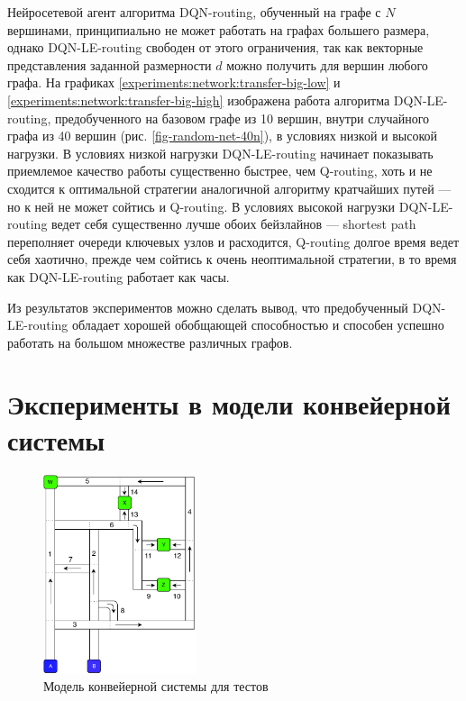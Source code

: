 \documentclass[specification,annotation,times]{itmo-student-thesis}
\theoremstyle{definition}
\begin{document}
Нейросетевой агент алгоритма DQN-routing, обученный на графе с $N$ вершинами,
принципиально не может работать на графах большего размера, однако
DQN-LE-routing свободен от этого ограничения, так как векторные представления
заданной размерности $d$ можно получить для вершин любого графа. На графиках
\ref{experiments:network:transfer-big-low} и
\ref{experiments:network:transfer-big-high} изображена работа алгоритма
DQN-LE-routing, предобученного на базовом графе из 10 вершин, внутри случайного
графа из 40 вершин (рис. \ref{fig-random-net-40n}), в условиях низкой и высокой
нагрузки. В условиях низкой нагрузки DQN-LE-routing начинает показывать
приемлемое качество работы существенно быстрее, чем Q-routing, хоть и не
сходится к оптимальной стратегии аналогичной алгоритму кратчайших путей --- но к
ней не может сойтись и Q-routing. В условиях высокой нагрузки DQN-LE-routing
ведет себя существенно лучше обоих бейзлайнов --- shortest path переполняет
очереди ключевых узлов и расходится, Q-routing долгое время ведет себя хаотично,
прежде чем сойтись к очень неоптимальной стратегии, в то время как
DQN-LE-routing работает как часы.

Из результатов экспериментов можно сделать вывод, что предобученный DQN-LE-routing обладает
хорошей обобщающей способностью и способен успешно работать на большом множестве
различных графов.

\section{Эксперименты в модели конвейерной системы}\label{experiments:conveyors}

\begin{figure}[!h]
  \caption{Модель конвейерной системы для тестов}\label{test-conveyors}
  \centering
  \includegraphics[width=0.4\textwidth]{conveyor-1-illustration-1}
\end{figure}
\end{document}
